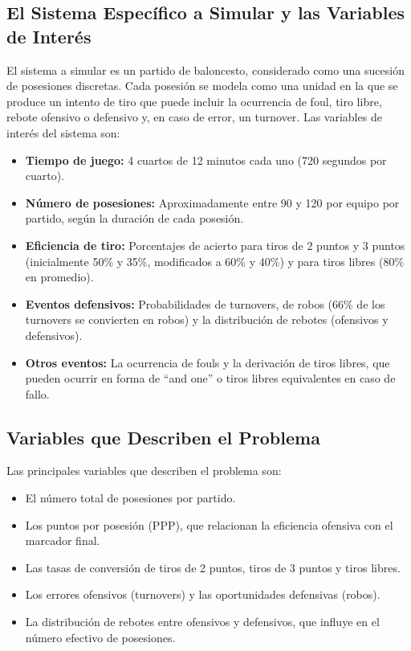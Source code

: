 \documentclass[12pt]{article}
\begin{document}
\subsection{El Sistema Específico a Simular y las Variables de Interés}
El sistema a simular es un partido de baloncesto, considerado como una sucesión de posesiones discretas. Cada posesión se modela como una unidad en la que se produce un intento de tiro que puede incluir la ocurrencia de foul, tiro libre, rebote ofensivo o defensivo y, en caso de error, un turnover. Las variables de interés del sistema son:
\begin{itemize}
    \item \textbf{Tiempo de juego:} 4 cuartos de 12 minutos cada uno (720 segundos por cuarto).
    \item \textbf{Número de posesiones:} Aproximadamente entre 90 y 120 por equipo por partido, según la duración de cada posesión.
    \item \textbf{Eficiencia de tiro:} Porcentajes de acierto para tiros de 2 puntos y 3 puntos (inicialmente 50\% y 35\%, modificados a 60\% y 40\%) y para tiros libres (80\% en promedio).
    \item \textbf{Eventos defensivos:} Probabilidades de turnovers, de robos (66\% de los turnovers se convierten en robos) y la distribución de rebotes (ofensivos y defensivos).
    \item \textbf{Otros eventos:} La ocurrencia de fouls y la derivación de tiros libres, que pueden ocurrir en forma de “and one” o tiros libres equivalentes en caso de fallo.
\end{itemize}

\subsection{Variables que Describen el Problema}
Las principales variables que describen el problema son:
\begin{itemize}
    \item El número total de posesiones por partido.
    \item Los puntos por posesión (PPP), que relacionan la eficiencia ofensiva con el marcador final.
    \item Las tasas de conversión de tiros de 2 puntos, tiros de 3 puntos y tiros libres.
    \item Los errores ofensivos (turnovers) y las oportunidades defensivas (robos).
    \item La distribución de rebotes entre ofensivos y defensivos, que influye en el número efectivo de posesiones.
\end{itemize}
\end{document}
